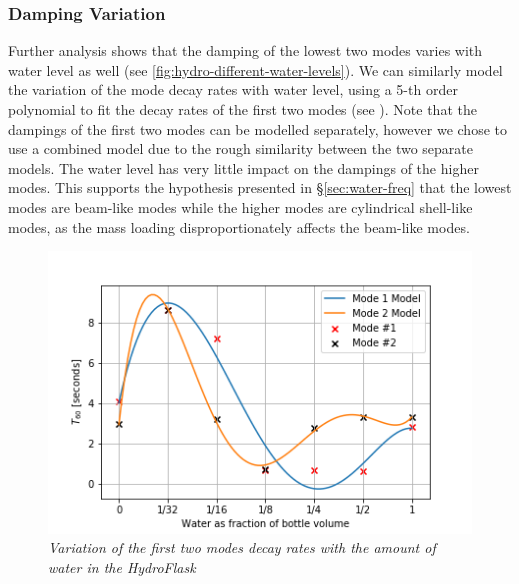\documentclass[twoside,a4paper]{article}
\begin{document}
\subsubsection{Damping Variation} \label{sec:water-damp}
%
Further analysis shows that the damping of the lowest two modes
varies with water level as well (see \cref{fig:hydro-different-water-levels}). We can similarly model the
variation of the mode decay rates with water level, using a
5-th order polynomial to fit the decay rates of the first
two modes (see ). Note that the dampings
of the first two modes can be modelled separately, however we chose
to use a combined model due to the rough similarity between the
two separate models. The water level has very little impact on the dampings of the higher modes. This supports the hypothesis presented in \S\ref{sec:water-freq} that the lowest modes are beam-like modes while the higher modes are cylindrical shell-like modes, as the mass loading disproportionately affects the beam-like modes. 
%
\begin{figure}[!t]
    \centering
    \includegraphics[width=\linewidth,trim={0 0 1cm 1cm},clip]{../Figures/Water_Damping}
    \caption{\it{Variation of the first two modes decay rates
                 with the amount of water in the HydroFlask}}
    \label{fig:water-mode-damp}
\end{figure}
%
\end{document}
